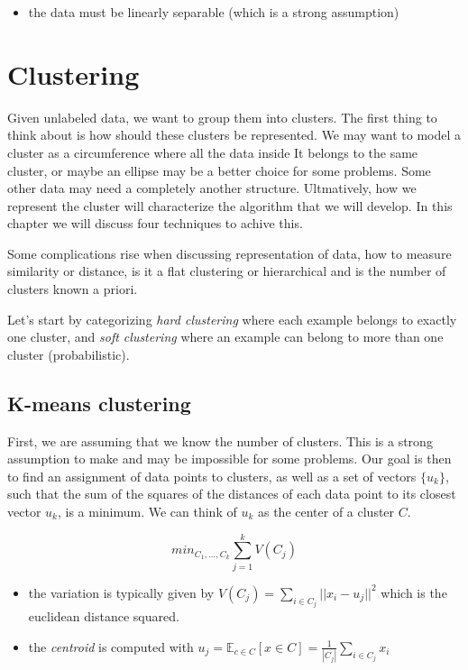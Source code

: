 \documentclass[11pt]{article}
\begin{document}
\begin{itemize}
\tightlist
\item
  the data must be linearly separable (which is a strong assumption)
\end{itemize}

\section{Clustering}\label{clustering}

Given unlabeled data, we want to group them into clusters. The first
thing to think about is how should these clusters be represented. We may
want to model a cluster as a circumference where all the data inside It
belongs to the same cluster, or maybe an ellipse may be a better choice
for some problems. Some other data may need a completely another
structure. Ultmatively, how we represent the cluster will characterize
the algorithm that we will develop. In this chapter we will discuss four
techniques to achive this.

Some complications rise when discussing representation of data, how to
measure similarity or distance, is it a flat clustering or hierarchical
and is the number of clusters known a priori.

Let's start by categorizing \emph{hard clustering} where each example
belongs to exactly one cluster, and \emph{soft clustering} where an
example can belong to more than one cluster (probabilistic).

\subsection{K-means clustering}\label{k-means-clustering}

First, we are assuming that we know the number of clusters. This is a
strong assumption to make and may be impossible for some problems. Our
goal is then to find an assignment of data points to clusters, as well
as a set of vectors \(\{u_k\}\), such that the sum of the squares of the
distances of each data point to its closest vector \(u_k\), is a
minimum. We can think of \(u_k\) as the center of a cluster \(C\).

\[min_{C_1, ..., C_k}\sum_{j=1}^kV(C_j)\]

\begin{itemize}
\tightlist
\item
  the variation is typically given by
  \(V(C_j) = \sum_{i\in C_j} ||x_i-u_j||^2\) which is the euclidean
  distance squared.
\item
  the \emph{centroid} is computed with
  \(u_j = \mathbb{E}_{c\in C}[x\in C] = \frac{1}{|C_j|}\sum_{i\in C_j} x_i\)
\end{itemize}
\end{document}
